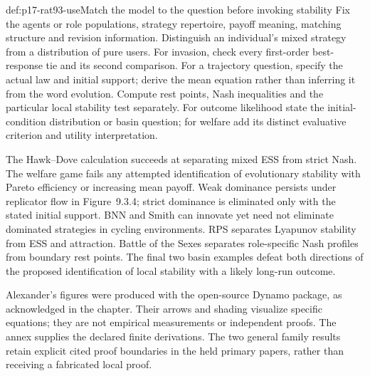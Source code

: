 \begin{hbmethod}{def:p17-rat93-use}{Match the model to the question before invoking stability}
Fix the agents or role populations, strategy repertoire, payoff meaning,
matching structure and revision information. Distinguish an individual's
mixed strategy from a distribution of pure users. For invasion, check
every first-order best-response tie and its second comparison. For a
trajectory question, specify the actual law and initial support; derive
the mean equation rather than inferring it from the word evolution.
Compute rest points, Nash inequalities and the particular local stability
test separately. For outcome likelihood state the initial-condition
distribution or basin question; for welfare add its distinct evaluative
criterion and utility interpretation.

The Hawk--Dove calculation succeeds at separating mixed ESS from strict
Nash. The welfare game fails any attempted identification of evolutionary
stability with Pareto efficiency or increasing mean payoff. Weak dominance
persists under replicator flow in Figure~9.3.4; strict dominance is
eliminated only with the stated initial support. BNN and Smith can innovate
yet need not eliminate dominated strategies in cycling environments.
RPS separates Lyapunov stability from ESS and attraction. Battle of the
Sexes separates role-specific Nash profiles from boundary rest points.
The final two basin examples defeat both directions of the proposed
identification of local stability with a likely long-run outcome.
\end{hbmethod}

Alexander's figures were produced with the open-source Dynamo package,
as acknowledged in the chapter. Their arrows and shading visualize
specific equations; they are not empirical measurements or independent
proofs. The annex supplies the declared finite derivations. The two
general family results retain explicit cited proof boundaries in the
held primary papers, rather than receiving a fabricated local proof.
